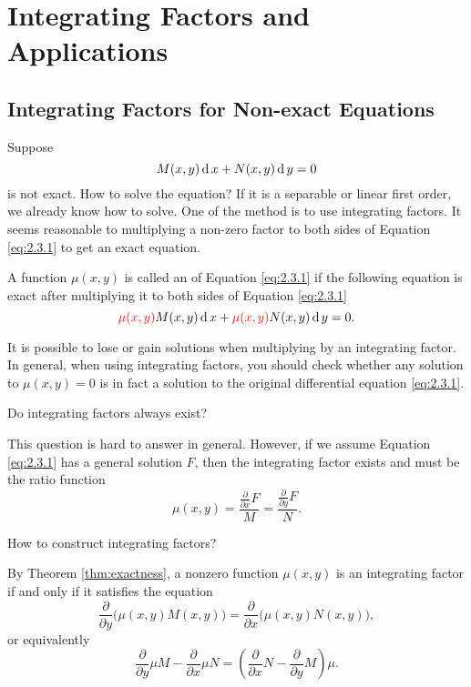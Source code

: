 \chapter{Integrating Factors and Applications}


\section{Integrating Factors for Non-exact Equations}

Suppose 
\begin{equation}
  M(x,y) \operatorname{d} x  + N(x,y)\operatorname{d} y  =0
  \label{eq:2.3.1}
\end{equation}
is not exact. How to solve the equation? If it is a separable or linear first order, we already know how to solve. One of the method is to use integrating factors.
It seems reasonable to multiplying a non-zero factor to both sides of Equation \eqref{eq:2.3.1} to get an exact equation.

\begin{definition}
  A function $\mu(x, y)$ is called an  of Equation \eqref{eq:2.3.1} if the following equation is exact after multiplying it to both sides of Equation \eqref{eq:2.3.1}
  \[{\color{red}\mu(x,y)}M(x,y) \operatorname{d} x + {\color{red}\mu(x,y)}N(x,y)\operatorname{d} y=0.\]
\end{definition}

\begin{remark}
  It is possible to lose or gain solutions when multiplying by an integrating factor. In general, when using integrating factors, you should check whether any solution
  to $\mu(x, y)=0$ is in fact a solution to the original differential equation \eqref{eq:2.3.1}.
\end{remark}

{\red Do integrating factors always exist?}

This question is hard to answer in general. However, if we assume Equation \eqref{eq:2.3.1} has a general solution $F$, then the integrating factor exists and must be the ratio function 
\[\mu(x, y)=\frac{\frac{\partial}{\partial x} F}{M}=\frac{\frac{\partial}{\partial y} F}{N}.\]

{\red How to construct integrating factors?}

By Theorem \ref{thm:exactness}, a nonzero function $\mu(x, y)$ is an integrating factor if and only if it satisfies the equation
\[\frac{\partial}{\partial y}\Big(\mu(x,y)M(x,y)\Big)=\frac{\partial}{\partial x}\Big(\mu(x,y)N(x,y)\Big),\]
or equivalently
\begin{equation}
  \frac{\partial}{\partial y}\mu M - \frac{\partial}{\partial x} \mu N=\left(\frac{\partial}{\partial x} N-\frac{\partial}{\partial y} M\right)\mu.
  \label{eq:2.3.2}
\end{equation}


